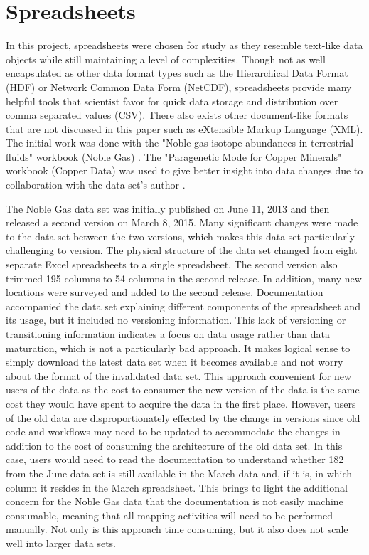 \section{Spreadsheets}

In this project, spreadsheets were chosen for study as they resemble text-like data objects while still maintaining a level of complexities.
Though not as well encapsulated as other data format types such as the Hierarchical Data Format (HDF) or Network Common Data Form (NetCDF), spreadsheets provide many helpful tools that scientist favor for quick data storage and distribution over comma separated values (CSV).
There also exists other document-like formats that are not discussed in this paper such as eXtensible Markup Language (XML).
The initial work was done with the "Noble gas isotope abundances in terrestrial fluids" workbook (Noble Gas) \cite{Polyak2015}.
The "Paragenetic Mode for Copper Minerals" workbook (Copper Data) was used to give better insight into data changes due to collaboration with the data set's author \cite{Morrison2016}.

The Noble Gas data set was initially published on June 11, 2013 and then released a second version on March 8, 2015.
Many significant changes were made to the data set between the two versions, which makes this data set particularly challenging to version.
The physical structure of the data set changed from eight separate Excel spreadsheets to a single spreadsheet.
The second version also trimmed 195 columns to 54 columns in the second release.
In addition, many new locations were surveyed and added to the second release.
Documentation accompanied the data set explaining different components of the spreadsheet and its usage, but it included no versioning information.
This lack of versioning or transitioning information indicates a focus on data usage rather than data maturation, which is not a particularly bad approach.
It makes logical sense to simply download the latest data set when it becomes available and not worry about the format of the invalidated data set.
This approach convenient for new users of the data as the cost to consumer the new version of the data is the same cost they would have spent to acquire the data in the first place.
However, users of the old data are disproportionately effected by the change in versions since old code and workflows may need to be updated to accommodate the changes in addition to the cost of consuming the architecture of the old data set.
In this case, users would need to read the documentation to understand whether 182 from the June data set is still available in the March data and, if it is, in which column it resides in the March spreadsheet.
This brings to light the additional concern for the Noble Gas data that the documentation is not easily machine consumable, meaning that all mapping activities will need to be performed manually.
Not only is this approach time consuming, but it also does not scale well into larger data sets.


